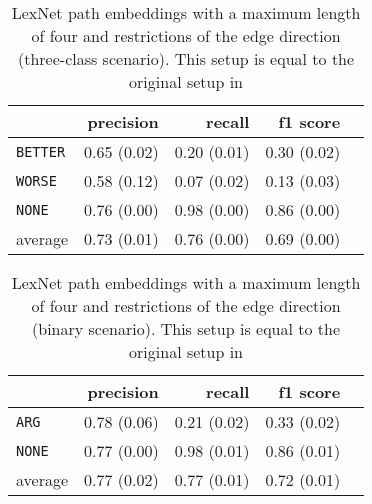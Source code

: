 	
	
	\begin{table}[h] 
		\centering 
		\caption{LexNet path embeddings with a maximum length of four and restrictions of the edge direction (three-class scenario). This setup is equal to the original setup in \cite{DBLP:journals/corr/ShwartzD16}} 
		\label{  }
		\begin{tabular}{@{}lrrrr@{}}
			\toprule
			        & precision                & recall                   & f1 score                 \\ \midrule 
			\texttt{BETTER}  & 0.65 \scriptsize{(0.02)} & 0.20 \scriptsize{(0.01)} & 0.30 \scriptsize{(0.02)} \\ 
			\texttt{WORSE}   & 0.58 \scriptsize{(0.12)} & 0.07 \scriptsize{(0.02)} & 0.13 \scriptsize{(0.03)} \\ 
			\texttt{NONE}    & 0.76 \scriptsize{(0.00)} & 0.98 \scriptsize{(0.00)} & 0.86 \scriptsize{(0.00)} \\ 
			average & 0.73 \scriptsize{(0.01)} & 0.76 \scriptsize{(0.00)} & 0.69 \scriptsize{(0.00)} \\ 
			\bottomrule
		\end{tabular}
	\end{table}
	
	\begin{table}[h] 
		\centering 
		\caption{LexNet path embeddings with a maximum length of four and restrictions of the edge direction (binary scenario). This setup is equal to the original setup in \cite{DBLP:journals/corr/ShwartzD16}} 
		\label{  }
		\begin{tabular}{@{}lrrrr@{}}
			\toprule
			        & precision                & recall                   & f1 score                 \\ \midrule 
			\texttt{ARG}     & 0.78 \scriptsize{(0.06)} & 0.21 \scriptsize{(0.02)} & 0.33 \scriptsize{(0.02)} \\ 
			\texttt{NONE}    & 0.77 \scriptsize{(0.00)} & 0.98 \scriptsize{(0.01)} & 0.86 \scriptsize{(0.01)} \\ 
			average & 0.77 \scriptsize{(0.02)} & 0.77 \scriptsize{(0.01)} & 0.72 \scriptsize{(0.01)} \\ 
			\bottomrule
		\end{tabular}
	\end{table}
	
